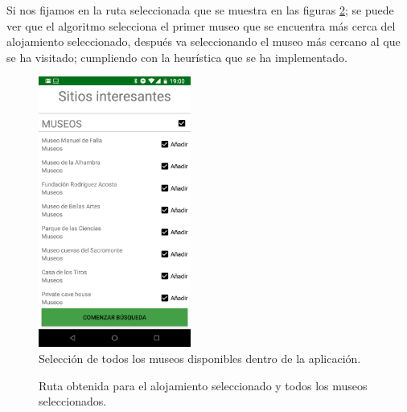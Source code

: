 Si nos fijamos en la ruta seleccionada que se muestra en las figuras \ref{fig:salida}; se puede ver que el algoritmo selecciona el primer museo que se encuentra más cerca del alojamiento seleccionado, después va seleccionando el museo más cercano al que se ha visitado; cumpliendo con la heurística que se ha implementado.
\newpage
\begin{figure}[H]
	\centering
	\includegraphics[width=50mm]{imagenes/seleccion_museos}
	\caption{Selección de todos los museos disponibles dentro de la aplicación.}
	\label{fig:selec_museos}
\end{figure}
\begin{figure}[H]
	\centering
	\caption{Ruta obtenida para el alojamiento seleccionado y todos los museos seleccionados.}
	\label{fig:salida}
\end{figure}

